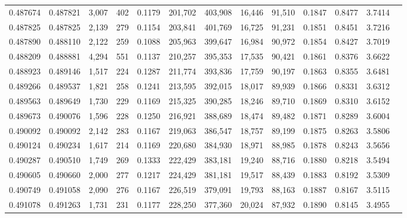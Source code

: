 \begin{tabular}{rrrrrrrrrrrrr}
0.487674 & 0.487821 &  3,007 &   402 &                                     0.1179 & 201,702 & 403,908 &  16,446 &  91,510 & 0.1847 & 0.8477 & 3.7414 \\
0.487825 & 0.487825 &  2,139 &   279 &                                     0.1154 & 203,841 & 401,769 &  16,725 &  91,231 & 0.1851 & 0.8451 & 3.7216 \\
0.487890 & 0.488110 &  2,122 &   259 &                                     0.1088 & 205,963 & 399,647 &  16,984 &  90,972 & 0.1854 & 0.8427 & 3.7019 \\
0.488209 & 0.488881 &  4,294 &   551 &                                     0.1137 & 210,257 & 395,353 &  17,535 &  90,421 & 0.1861 & 0.8376 & 3.6622 \\
0.488923 & 0.489146 &  1,517 &   224 &                                     0.1287 & 211,774 & 393,836 &  17,759 &  90,197 & 0.1863 & 0.8355 & 3.6481 \\
0.489266 & 0.489537 &  1,821 &   258 &                                     0.1241 & 213,595 & 392,015 &  18,017 &  89,939 & 0.1866 & 0.8331 & 3.6312 \\
0.489563 & 0.489649 &  1,730 &   229 &                                     0.1169 & 215,325 & 390,285 &  18,246 &  89,710 & 0.1869 & 0.8310 & 3.6152 \\
0.489673 & 0.490076 &  1,596 &   228 &                                     0.1250 & 216,921 & 388,689 &  18,474 &  89,482 & 0.1871 & 0.8289 & 3.6004 \\
0.490092 & 0.490092 &  2,142 &   283 &                                     0.1167 & 219,063 & 386,547 &  18,757 &  89,199 & 0.1875 & 0.8263 & 3.5806 \\
0.490124 & 0.490234 &  1,617 &   214 &                                     0.1169 & 220,680 & 384,930 &  18,971 &  88,985 & 0.1878 & 0.8243 & 3.5656 \\
0.490287 & 0.490510 &  1,749 &   269 &                                     0.1333 & 222,429 & 383,181 &  19,240 &  88,716 & 0.1880 & 0.8218 & 3.5494 \\
0.490605 & 0.490660 &  2,000 &   277 &                                     0.1217 & 224,429 & 381,181 &  19,517 &  88,439 & 0.1883 & 0.8192 & 3.5309 \\
0.490749 & 0.491058 &  2,090 &   276 &                                     0.1167 & 226,519 & 379,091 &  19,793 &  88,163 & 0.1887 & 0.8167 & 3.5115 \\
0.491078 & 0.491263 &  1,731 &   231 &                                     0.1177 & 228,250 & 377,360 &  20,024 &  87,932 & 0.1890 & 0.8145 & 3.4955 \\

\end{tabular}
